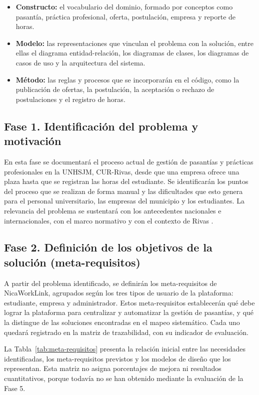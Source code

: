 \begin{itemize}
	\item \textbf{Constructo:} el vocabulario del dominio, formado por conceptos como pasantía, práctica profesional, oferta, postulación, empresa y reporte de horas.
	\item \textbf{Modelo:} las representaciones que vinculan el problema con la solución, entre ellas el diagrama entidad-relación, los diagramas de clases, los diagramas de casos de uso y la arquitectura del sistema.
	\item \textbf{Método:} las reglas y procesos que se incorporarán en el código, como la publicación de ofertas, la postulación, la aceptación o rechazo de postulaciones y el registro de horas.
\end{itemize}

\subsection{Fase 1. Identificación del problema y motivación}

En esta fase se documentará el proceso actual de gestión de pasantías y prácticas profesionales en la UNHSJM, CUR-Rivas, desde que una empresa ofrece una plaza hasta que se registran las horas del estudiante. Se identificarán los puntos del proceso que se realizan de forma manual y las dificultades que esto genera para el personal universitario, las empresas del municipio y los estudiantes. La relevancia del problema se sustentará con los antecedentes nacionales e internacionales, con el marco normativo y con el contexto de Rivas \parencite{peffers2007}.

\subsection{Fase 2. Definición de los objetivos de la solución (meta-requisitos)}

A partir del problema identificado, se definirán los meta-requisitos de NicaWorkLink, agrupados según los tres tipos de usuario de la plataforma: estudiante, empresa y administrador. Estos meta-requisitos establecerán qué debe lograr la plataforma para centralizar y automatizar la gestión de pasantías, y qué la distingue de las soluciones encontradas en el mapeo sistemático. Cada uno quedará registrado en la matriz de trazabilidad, con su indicador de evaluación.

La Tabla~\ref{tab:meta-requisitos} presenta la relación inicial entre las necesidades identificadas, los meta-requisitos previstos y los modelos de diseño que los representan. Esta matriz no asigna porcentajes de mejora ni resultados cuantitativos, porque todavía no se han obtenido mediante la evaluación de la Fase 5.

